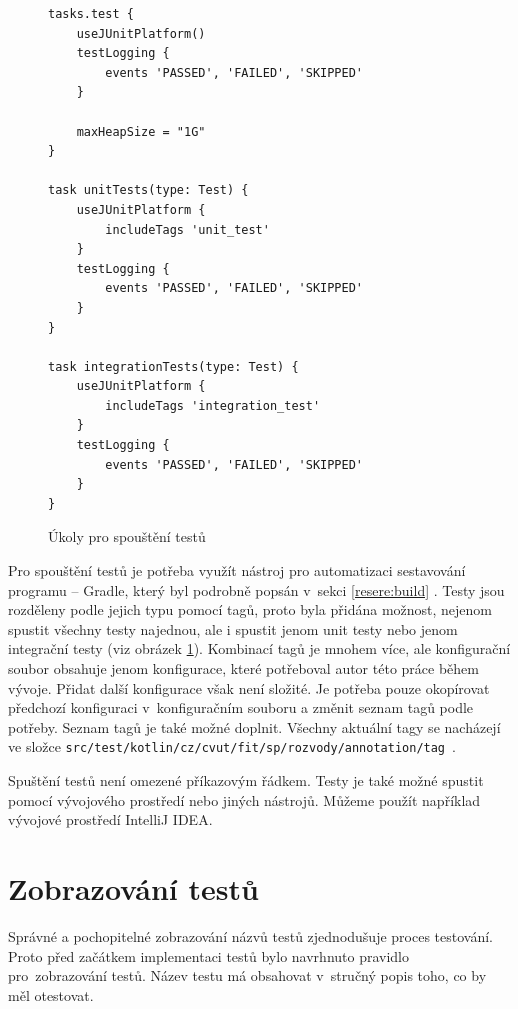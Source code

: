     \begin{figure}
        \begin{verbatim}
tasks.test {
    useJUnitPlatform()
    testLogging {
        events 'PASSED', 'FAILED', 'SKIPPED'
    }

    maxHeapSize = "1G"
}

task unitTests(type: Test) {
    useJUnitPlatform {
        includeTags 'unit_test'
    }
    testLogging {
        events 'PASSED', 'FAILED', 'SKIPPED'
    }
}

task integrationTests(type: Test) {
    useJUnitPlatform {
        includeTags 'integration_test'
    }
    testLogging {
        events 'PASSED', 'FAILED', 'SKIPPED'
    }
}
        \end{verbatim}
        \caption{Úkoly pro spouštění testů} 
        \label{code:gradle-tests}
    \end{figure}
    Pro spouštění testů je potřeba využít nástroj pro automatizaci sestavování programu -- Gradle, který byl podrobně popsán v~sekci \ref{resere:build} . Testy jsou rozděleny podle jejich typu pomocí tagů, proto byla přidána možnost, nejenom spustit všechny testy najednou, ale i spustit jenom unit testy nebo jenom integrační testy (viz obrázek \ref{code:gradle-tests}). Kombinací tagů je mnohem více, ale konfigurační soubor obsahuje jenom konfigurace, které potřeboval autor této práce během vývoje. 
    Přidat další konfigurace však není složité. Je potřeba pouze okopírovat předchozí konfiguraci v~konfiguračním souboru a změnit seznam tagů podle potřeby. Seznam tagů je také možné doplnit. Všechny aktuální tagy se nacházejí ve složce \verb|src/test/kotlin/cz/cvut/fit/sp/rozvody/annotation/tag|~.
    
    Spuštění testů není omezené příkazovým řádkem. Testy je také možné spustit pomocí vývojového prostředí nebo jiných nástrojů. Můžeme použít například vývojové prostředí IntelliJ IDEA. 
\section{Zobrazování testů}\label{testovani:zobrazovani}
    Správné a pochopitelné zobrazování názvů testů zjednodušuje proces testování. Proto před začátkem implementaci testů bylo navrhnuto pravidlo pro~zobrazování testů. Název testu má obsahovat v~stručný popis toho, co by měl otestovat. 
    

